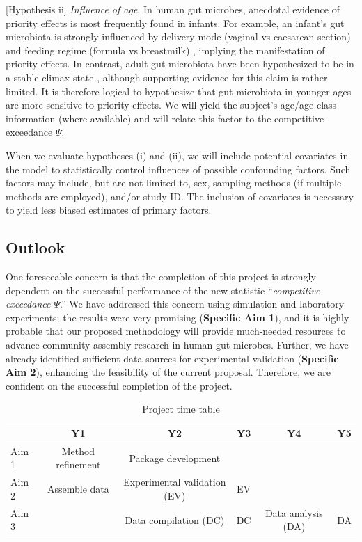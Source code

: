 \documentclass[12pt, class=article, crop=false]{standalone}
\begin{document}
[Hypothesis ii] \textit{Influence of age}.
In human gut microbes, anecdotal evidence of priority effects is most frequently found in infants.
For example, an infant's gut microbiota is strongly influenced by delivery mode (vaginal vs caesarean section) and feeding regime (formula vs breastmilk) \citep{bokulich_antibiotics_2016, akagawa_effect_2019, dominguez-bello_delivery_2010}, implying the manifestation of priority effects.
In contrast, adult gut microbiota have been hypothesized to be in a stable climax state \citep{fierer_animalcules_2012}, although supporting evidence for this claim is rather limited.
It is therefore logical to hypothesize that gut microbiota in younger ages are more sensitive to priority effects.
We will yield the subject's age/age-class information (where available) and will relate this factor to the competitive exceedance $\Psi$.

When we evaluate hypotheses (i) and (ii), we will include potential covariates in the model to statistically control influences of possible confounding factors.
Such factors may include, but are not limited to, sex, sampling methods (if multiple methods are employed), and/or study ID.
The inclusion of covariates is necessary to yield less biased estimates of primary factors.

\subsection*{Outlook}

One foreseeable concern is that the completion of this project is strongly dependent on the successful performance of the new statistic ``\textit{competitive exceedance $\Psi$}.''
We have addressed this concern using simulation and laboratory experiments; the results were very promising (\textbf{Specific Aim 1}), and it is highly probable that our proposed methodology will provide much-needed resources to advance community assembly research in human gut microbes.
Further, we have already identified sufficient data sources for experimental validation (\textbf{Specific Aim 2}), enhancing the feasibility of the current proposal.
Therefore, we are confident on the successful completion of the project.

\begin{table}
    \centering
    \caption{Project time table}
    \begin{tabular}{lccccc}
         & Y1 &  Y2 & Y3 & Y4 & Y5\\
         \hline
         Aim 1 & Method refinement & Package development & & & \\
         Aim 2 & Assemble data & Experimental validation (EV) & EV &  & \\
         Aim 3 & & Data compilation (DC) & DC & Data analysis (DA) & DA \\
    \end{tabular}
    \label{tab:tt}
\end{table}
\end{document}
